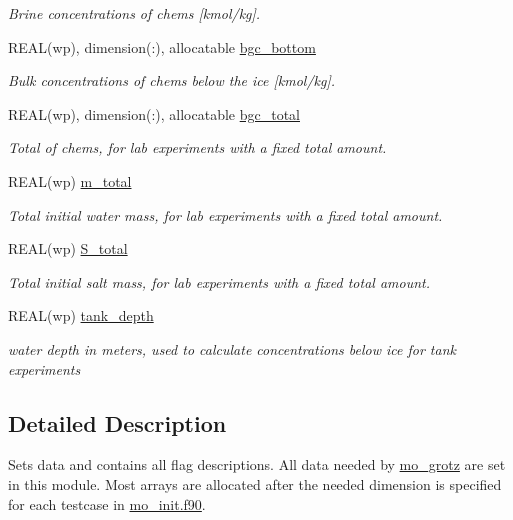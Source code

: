 \begin{DoxyCompactItemize}
\begin{DoxyCompactList}\small\item\em Brine concentrations of chems \mbox{[}kmol/kg\mbox{]}. \item\end{DoxyCompactList}\item 
REAL(wp), dimension(:), allocatable \hyperlink{namespacemo__data_a7a31686a7563ca77bbe2aa8eaa14cfd2}{bgc\_\-bottom}
\begin{DoxyCompactList}\small\item\em Bulk concentrations of chems below the ice \mbox{[}kmol/kg\mbox{]}. \item\end{DoxyCompactList}\item 
REAL(wp), dimension(:), allocatable \hyperlink{namespacemo__data_a15d6538801561a4daac86ca856ff99c5}{bgc\_\-total}
\begin{DoxyCompactList}\small\item\em Total of chems, for lab experiments with a fixed total amount. \item\end{DoxyCompactList}\item 
REAL(wp) \hyperlink{namespacemo__data_a075b7537738c70f4bc97adf551be3b75}{m\_\-total}
\begin{DoxyCompactList}\small\item\em Total initial water mass, for lab experiments with a fixed total amount. \item\end{DoxyCompactList}\item 
REAL(wp) \hyperlink{namespacemo__data_a48908c6562a2cb9ef6b51897c4c27716}{S\_\-total}
\begin{DoxyCompactList}\small\item\em Total initial salt mass, for lab experiments with a fixed total amount. \item\end{DoxyCompactList}\item 
REAL(wp) \hyperlink{namespacemo__data_aa2b42f87a9dc571898326286dfab4350}{tank\_\-depth}
\begin{DoxyCompactList}\small\item\em water depth in meters, used to calculate concentrations below ice for tank experiments \item\end{DoxyCompactList}\end{DoxyCompactItemize}


\subsection{Detailed Description}
Sets data and contains all flag descriptions. All data needed by \hyperlink{namespacemo__grotz}{mo\_\-grotz} are set in this module. Most arrays are allocated after the needed dimension is specified for each testcase in \hyperlink{mo__init_8f90}{mo\_\-init.f90}.

